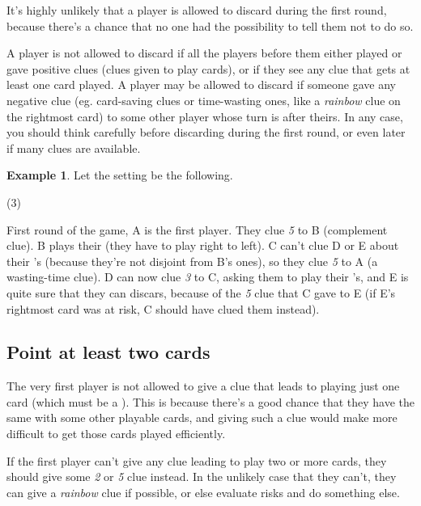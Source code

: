 \documentclass[a4paper]{article}
\theoremstyle{plain}
\theoremstyle{definition}
\newtheorem{example}[theorem]{Example}
\begin{document}
It's highly unlikely that a player is allowed to discard during the first round, because there's a chance that no one had the possibility to tell them not to do so.

A player is not allowed to discard if all the players before them either played or gave positive clues (clues given to play cards), or if they see any clue that gets at least one card played. A player may be allowed to discard if someone gave any negative clue (eg. card-saving clues or time-wasting ones, like a \textit{rainbow} clue on the rightmost card) to some other player whose turn is after theirs. In any case, you should think carefully before discarding during the first round, or even later if many clues are available.

\begin{example}
	
	Let the setting be the following.
	
	\begin{tasks}(3)
		\task[+]      
		\task[A]    
		\task[B]    
		\task[C]    
		\task[D]    
		\task[E]    
	\end{tasks}
	
	First round of the game, A is the first player. They clue \textit{5} to B (complement clue). B plays their  (they have to play right to left). C can't clue D or E about their 's (because they're not disjoint from B's ones), so they clue \textit{5} to A (a wasting-time clue). D can now clue \textit{3} to C, asking them to play their 's, and E is quite sure that they can discars, because of the \textit{5} clue that C gave to E (if E's rightmost card was at risk, C should have clued them instead).
\end{example}

\subsection{Point at least two cards}

The very first player is not allowed to give a clue that leads to playing just one card (which must be a ). This is because there's a good chance that they have the same  with some other playable cards, and giving such a clue would make more difficult to get those cards played efficiently.

If the first player can't give any clue leading to play two or more cards, they should give some \textit{2} or \textit{5} clue instead. In the unlikely case that they can't, they can give a \textit{rainbow} clue if possible, or else evaluate risks and do something else.
\end{document}
